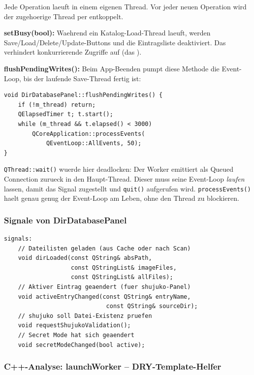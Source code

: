 Jede Operation laeuft in einem eigenen Thread.
Vor jeder neuen Operation wird der zugehoerige Thread
per  entkoppelt.

\begin{neuin}[title={Neu in v0.5.42: setBusy und flushPendingWrites}]
\textbf{setBusy(bool):} Waehrend ein Katalog-Load-Thread
laeuft, werden Save/Load/Delete/Update-Buttons und die
Eintragsliste deaktiviert. Das verhindert konkurrierende
Zugriffe auf  (das ).

\textbf{flushPendingWrites():} Beim App-Beenden pumpt
diese Methode die Event-Loop, bis der laufende Save-Thread
fertig ist:
\begin{lstlisting}
void DirDatabasePanel::flushPendingWrites() {
    if (!m_thread) return;
    QElapsedTimer t; t.start();
    while (m_thread && t.elapsed() < 3000)
        QCoreApplication::processEvents(
            QEventLoop::AllEvents, 50);
}
\end{lstlisting}
\verb|QThread::wait()| wuerde hier deadlocken:
Der Worker emittiert  als Queued
Connection zurueck in den Haupt-Thread. Dieser muss seine
Event-Loop \emph{laufen} lassen, damit das Signal
zugestellt und \verb|quit()| aufgerufen wird.
\verb|processEvents()| haelt genau genug der Event-Loop
am Leben, ohne den Thread zu blockieren.
\end{neuin}

\subsubsection{Signale von DirDatabasePanel}

\begin{lstlisting}[style=header]
signals:
    // Dateilisten geladen (aus Cache oder nach Scan)
    void dirLoaded(const QString& absPath,
                   const QStringList& imageFiles,
                   const QStringList& allFiles);
    // Aktiver Eintrag geaendert (fuer shujuko-Panel)
    void activeEntryChanged(const QString& entryName,
                             const QString& sourceDir);
    // shujuko soll Datei-Existenz pruefen
    void requestShujukoValidation();
    // Secret Mode hat sich geaendert
    void secretModeChanged(bool active);
\end{lstlisting}

\subsubsection{C++-Analyse: launchWorker -- DRY-Template-Helfer}

